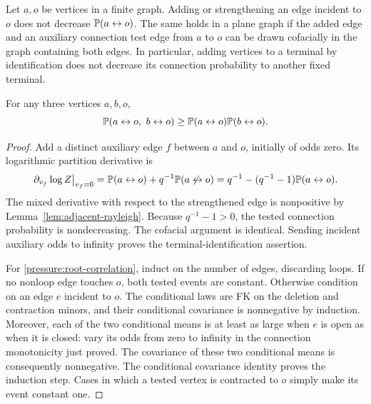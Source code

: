 \begin{lemma}
\label{pressure:network-monotonicity}
Let $a,o$ be vertices in a finite graph. Adding or strengthening an
edge incident to $o$ does not decrease $\mathbb P(a\leftrightarrow o)$. The same
holds in a plane graph if the added edge and an auxiliary connection
test edge from $a$ to $o$ can be drawn cofacially in the graph
containing both edges. In particular, adding vertices to a terminal
by identification does not decrease its connection probability to another
fixed terminal.

For any three vertices $a,b,o$,
\begin{equation}
 \mathbb P(a\leftrightarrow o,\ b\leftrightarrow o)
 \ge \mathbb P(a\leftrightarrow o)\mathbb P(b\leftrightarrow o).
 \label{pressure:root-correlation}
\end{equation}
\end{lemma}

\begin{proof}
Add a distinct auxiliary edge $f$ between $a$ and $o$, initially of
odds zero. Its logarithmic partition derivative is
\begin{equation}
 \left.\partial_{v_f}\log Z\right|_{v_f=0}
 =\mathbb P(a\leftrightarrow o)+q^{-1}\mathbb P(a\not\leftrightarrow o)
 =q^{-1}-(q^{-1}-1)\mathbb P(a\leftrightarrow o).
 \label{pressure:test-edge}
\end{equation}
The mixed derivative with respect to the strengthened edge is
nonpositive by Lemma~\ref{lem:adjacent-rayleigh}. Because
$q^{-1}-1>0$, the tested connection probability is nondecreasing.
The cofacial argument is identical. Sending incident auxiliary odds
to infinity proves the terminal-identification assertion.

For \eqref{pressure:root-correlation}, induct on the number of edges,
discarding loops. If no nonloop edge touches $o$, both tested events
are constant. Otherwise condition on an edge $e$ incident to $o$.
The conditional laws are FK on the deletion and contraction minors,
and their conditional covariance is nonnegative by induction.
Moreover, each of the two conditional means is at least as large
when $e$ is open as when it is closed: vary its odds from zero to
infinity in the connection monotonicity just proved. The covariance
of these two conditional means is consequently nonnegative. The
conditional covariance identity proves the induction step. Cases
in which a tested vertex is contracted to $o$ simply make its event
constant one.
\end{proof}

